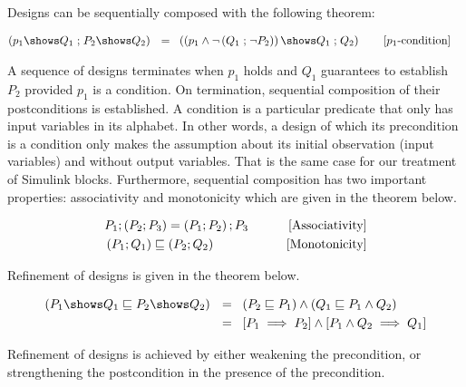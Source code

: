 Designs can be sequentially composed with the following theorem:
\begin{theorem} \label{thm:des_seq}
    \begin{align*}
        \left(\design{p_1}{Q_1} \relsemi \design{P_2}{Q_2}\right) ~~=~~& 
        \left(\design{\left(p_1 \land \lnot \left(Q_1 \relsemi \lnot P_2\right)\right)}{Q_1 \relsemi Q_2}\right) \tag*{[$p_1$-condition]}
    \end{align*}
\end{theorem}

A sequence of designs terminates when $p_1$ holds and $Q_1$ guarantees to establish $P_2$ provided $p_1$ is a condition. On termination, sequential composition of their postconditions is established. A condition is a particular predicate that only has input variables in its alphabet. In other words, a design of which its precondition is a condition only makes the assumption about its initial observation (input variables) and without output variables. That is the same case for our treatment of Simulink blocks. Furthermore, sequential composition has two important properties: associativity and monotonicity which are given in the theorem below.
\begin{theorem}
    \begin{align*}
        & P_1 \dcomp \left(P_2 \dcomp P_3\right) = \left(P_1 \dcomp P_2\right) \dcomp P_3 & \tag*{[Associativity]} \\
        & \left(P_1 \dcomp Q_1\right) \refinedby \left(P_2 \dcomp Q_2\right) & \tag*{[Monotonicity]} 
    \end{align*}
    \label{thm:seq}
\end{theorem}

Refinement of designs is given in the theorem below.
\begin{theorem}[Refinement]
    \begin{align*}
        \left(\design{P_1}{Q_1} \refinedby \design{P_2}{Q_2}\right) ~~=~~& \left(P_2 \refinedby P_1\right) \land \left(Q_1 \refinedby P_1 \land Q_2\right)\\
                                                     ~~=~~& \left[P_1 \implies P_2\right] \land \left[P_1 \land Q_2 \implies Q_1\right]\\
    \end{align*}
\end{theorem}
Refinement of designs is achieved by either weakening the precondition, or strengthening the postcondition in the presence of the precondition.

